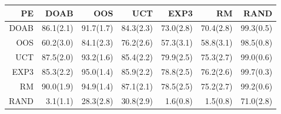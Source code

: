 \begin{figure}
\begin{scriptsize}

\begin{tabular}{|r|rrrrrr|}\hline
PE&DOAB&OOS&UCT&EXP3&RM&RAND\\\hline
DOAB&86.1(2.1)&91.7(1.7)&84.3(2.3)&73.0(2.8)&70.4(2.8)&99.3(0.5)\\
OOS&60.2(3.0)&84.1(2.3)&76.2(2.6)&57.3(3.1)&58.8(3.1)&98.5(0.8)\\
UCT&87.5(2.0)&93.2(1.6)&85.4(2.2)&79.9(2.5)&75.3(2.7)&99.0(0.6)\\
EXP3&85.3(2.2)&95.0(1.4)&85.9(2.2)&78.8(2.5)&76.2(2.6)&99.7(0.3)\\
RM&90.0(1.9)&94.9(1.4)&87.1(2.1)&78.5(2.5)&75.2(2.7)&99.2(0.6)\\
RAND&3.1(1.1)&28.3(2.8)&30.8(2.9)&1.6(0.8)&1.5(0.8)&71.0(2.8)\\
\hline
\end{tabular}


\end{scriptsize}
\end{figure}
